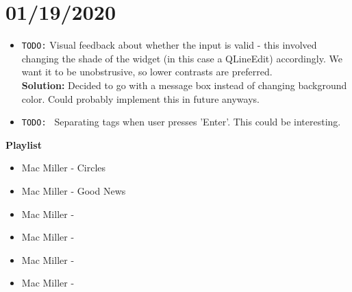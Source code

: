\documentclass{article}
\begin{document}
\section{01/19/2020}
\begin{itemize}
	\item \texttt{TODO:} Visual feedback about whether the input is valid - this involved changing the shade of the widget (in this case a QLineEdit) accordingly. We want it to be unobstrusive, so lower contrasts are preferred.\\
	\textbf{Solution: }Decided to go with a message box instead of changing background color. Could probably implement this in future anyways.
	\item \texttt{TODO: } Separating tags when user presses 'Enter'. This could be interesting. 
\end{itemize}
\textbf{Playlist}
\begin{itemize}
	\item Mac Miller - Circles
	\item Mac Miller - Good News
	\item Mac Miller - 
	\item Mac Miller - 
	\item Mac Miller - 
	\item Mac Miller - 
\end{itemize}
\end{document}
